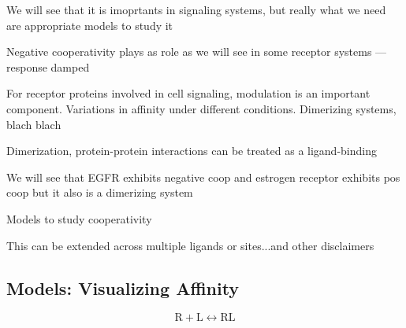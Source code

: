 \documentclass{article}
\numberwithin{equation}{section}
\begin{document}
We will see that it is imoprtants in signaling systems, but really what we need are appropriate models to study it



Negative cooperativity plays as role as we will see in some receptor systems --- response damped


For receptor proteins involved in cell signaling, modulation is an important component. Variations in affinity under different conditions. Dimerizing systems, blach blach

Dimerization, protein-protein interactions can be treated as a ligand-binding

We will see that EGFR exhibits negative coop and estrogen receptor exhibits pos coop but it also is a dimerizing system

Models to study cooperativity

This can be extended across multiple ligands or sites...and other disclaimers

\subsection*{Models: Visualizing Affinity}

\begin{equation}
	\text{R} + \text{L} \leftrightarrow \text{RL}
	\end{equation}
 
\end{document}
